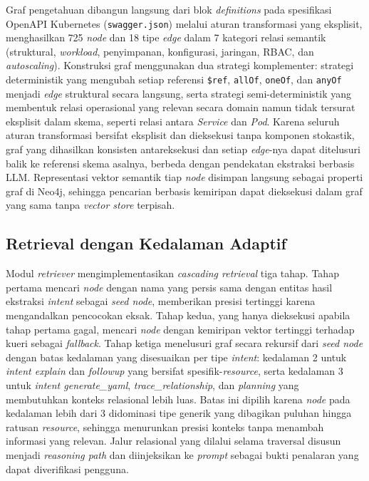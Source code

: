 \documentclass{ieeeaccess}
\begin{document}
Graf pengetahuan dibangun langsung dari blok \textit{definitions} pada spesifikasi OpenAPI Kubernetes (\texttt{swagger.json}) melalui aturan transformasi yang eksplisit, menghasilkan 725 \textit{node} dan 18 tipe \textit{edge} dalam 7 kategori relasi semantik (struktural, \textit{workload}, penyimpanan, konfigurasi, jaringan, RBAC, dan \textit{autoscaling}). Konstruksi graf menggunakan dua strategi komplementer: strategi deterministik yang mengubah setiap referensi \texttt{\$ref}, \texttt{allOf}, \texttt{oneOf}, dan \texttt{anyOf} menjadi \textit{edge} struktural secara langsung, serta strategi semi-deterministik yang membentuk relasi operasional yang relevan secara domain namun tidak tersurat eksplisit dalam skema, seperti relasi antara \textit{Service} dan \textit{Pod}. Karena seluruh aturan transformasi bersifat eksplisit dan dieksekusi tanpa komponen stokastik, graf yang dihasilkan konsisten antareksekusi dan setiap \textit{edge}-nya dapat ditelusuri balik ke referensi skema asalnya, berbeda dengan pendekatan ekstraksi berbasis LLM. Representasi vektor semantik tiap \textit{node} disimpan langsung sebagai properti graf di Neo4j, sehingga pencarian berbasis kemiripan dapat dieksekusi dalam graf yang sama tanpa \textit{vector store} terpisah.

\subsection{Retrieval dengan Kedalaman Adaptif}

Modul \textit{retriever} mengimplementasikan \textit{cascading retrieval} tiga tahap. Tahap pertama mencari \textit{node} dengan nama yang persis sama dengan entitas hasil ekstraksi \textit{intent} sebagai \textit{seed node}, memberikan presisi tertinggi karena mengandalkan pencocokan eksak. Tahap kedua, yang hanya dieksekusi apabila tahap pertama gagal, mencari \textit{node} dengan kemiripan vektor tertinggi terhadap kueri sebagai \textit{fallback}. Tahap ketiga menelusuri graf secara rekursif dari \textit{seed node} dengan batas kedalaman yang disesuaikan per tipe \textit{intent}: kedalaman 2 untuk \textit{intent explain} dan \textit{followup} yang bersifat spesifik-\textit{resource}, serta kedalaman 3 untuk \textit{intent generate\_yaml}, \textit{trace\_relationship}, dan \textit{planning} yang membutuhkan konteks relasional lebih luas. Batas ini dipilih karena \textit{node} pada kedalaman lebih dari 3 didominasi tipe generik yang dibagikan puluhan hingga ratusan \textit{resource}, sehingga menurunkan presisi konteks tanpa menambah informasi yang relevan. Jalur relasional yang dilalui selama traversal disusun menjadi \textit{reasoning path} dan diinjeksikan ke \textit{prompt} sebagai bukti penalaran yang dapat diverifikasi pengguna.
\end{document}

